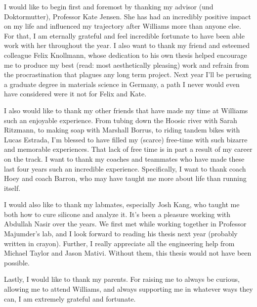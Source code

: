 
I would like to begin first and foremost by thanking my advisor (und Doktormutter), Professor Kate Jensen. She has had an incredibly positive impact on my life and influenced my trajectory after Williams more than anyone else. For that, I am eternally grateful and feel incredible fortunate to have been able work with her throughout the year. I also want to thank my friend and esteemed colleague Felix Knollmann, whose dedication to his own thesis helped encourage me to produce my best (read: most aesthetically pleasing) work and refrain from the procrastination that plagues any long term project. Next year I'll be perusing a graduate degree in materials science in Germany, a path I never would even have considered were it not for Felix and Kate. 

I also would like to thank my other friends that have made my time at Williams such an enjoyable experience. From tubing down the Hoosic river with Sarah Ritzmann, to making soap with Marshall Borrus, to riding tandem bikes with Lucas Estrada, I'm blessed to have filled my (scarce) free-time with such bizarre and memorable experiences. That lack of free time is in part a result of my career on the track. I want to thank my coaches and teammates who have made these last four years such an incredible experience. Specifically, I want to thank coach Hoey and coach Barron, who may have taught me more about life than running itself. 

I would also like to thank my labmates, especially Josh Kang, who taught me both how to cure silicone and analyze it. It's been a pleasure working with Abdullah Nasir over the years. We first met while working together in Professor Majumder's lab, and I look forward to reading his thesis next year (probably written in crayon). Further, I really appreciate all the engineering help from Michael Taylor and Jason Mativi. Without them, this thesis would not have been possible.

Lastly, I would like to thank my parents. For raising me to always be curious, allowing me to attend Williams, and always supporting me in whatever ways they can, I am extremely grateful and fortunate. 


